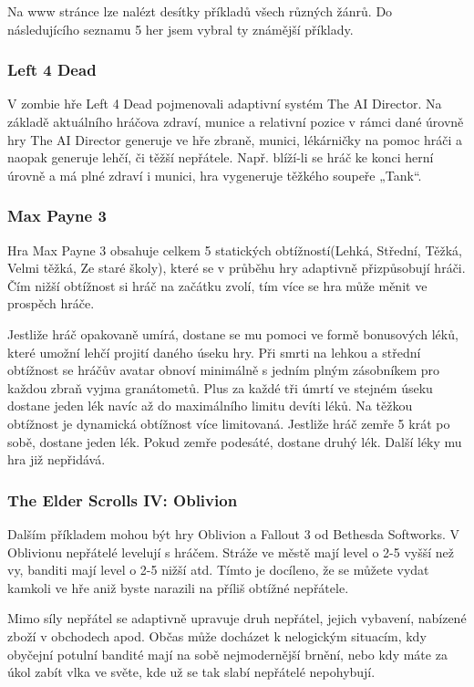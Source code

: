 Na www stránce \cite{1} lze nalézt desítky příkladů všech různých žánrů. Do následujícího seznamu 5 her jsem vybral ty známější příklady.

\subsubsection{Left 4 Dead}
\label{sec:Left4Dead}

V zombie hře Left 4 Dead pojmenovali adaptivní systém The AI Director. Na základě aktuálního hráčova zdraví, munice a relativní pozice v rámci dané úrovně hry The AI Director generuje ve hře zbraně, munici, lékárničky na pomoc hráči a naopak generuje lehčí, či těžší nepřátele. Např. blíží-li se hráč ke konci herní úrovně a má plné zdraví i munici, hra vygeneruje těžkého soupeře „Tank“\cite{2}. 

\subsubsection{Max Payne 3}

Hra Max Payne 3 obsahuje celkem 5 statických obtížností(Lehká, Střední, Těžká, Velmi těžká, Ze staré školy), které se v průběhu hry adaptivně přizpůsobují hráči. Čím nižší obtížnost si hráč na začátku zvolí, tím více se hra může měnit ve prospěch hráče.

Jestliže hráč opakovaně umírá, dostane se mu pomoci ve formě bonusových léků, které umožní lehčí projití daného úseku hry. Při smrti na lehkou a střední obtížnost se hráčův avatar obnoví minimálně s jedním plným zásobníkem pro každou zbraň vyjma granátometů. Plus za každé tři úmrtí ve stejném úseku dostane jeden lék navíc až do maximálního limitu devíti léků.
Na těžkou obtížnost je dynamická obtížnost více limitovaná. Jestliže hráč zemře 5 krát po sobě, dostane jeden lék. Pokud zemře podesáté, dostane druhý lék. Další léky mu hra již nepřidává\cite{3}. 

\subsubsection{The Elder Scrolls IV: Oblivion}

Dalším příkladem mohou být hry Oblivion a Fallout 3 od Bethesda Softworks. V Oblivionu nepřátelé levelují s hráčem. Stráže ve městě mají level o 2-5 vyšší než vy, banditi mají level o 2-5 nižší atd. Tímto je docíleno, že se můžete vydat kamkoli ve hře aniž byste narazili na příliš obtížné nepřátele. 

Mimo síly nepřátel se adaptivně upravuje druh nepřátel, jejich vybavení, nabízené zboží v obchodech apod. Občas může docházet k nelogickým situacím, kdy obyčejní potulní bandité mají na sobě nejmodernější brnění, nebo kdy máte za úkol zabít vlka ve světe, kde už se tak slabí nepřátelé nepohybují\cite{4}. 

